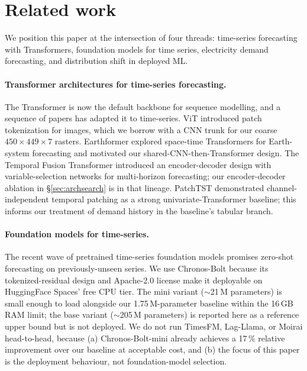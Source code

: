 
\section{Related work}
\label{sec:relwork}

We position this paper at the intersection of four threads: time-series forecasting with Transformers, foundation models for time series, electricity demand forecasting, and distribution shift in deployed ML.

\paragraph{Transformer architectures for time-series forecasting.} The Transformer \citep{vaswani2017attention} is now the default backbone for sequence modelling, and a sequence of papers has adapted it to time-series. ViT \citep{dosovitskiy2021vit} introduced patch tokenization for images, which we borrow with a CNN trunk for our coarse $450{\times}449{\times}7$ rasters. Earthformer \citep{gao2022earthformer} explored space-time Transformers for Earth-system forecasting and motivated our shared-CNN-then-Transformer design. The Temporal Fusion Transformer \citep{lim2021tft} introduced an encoder-decoder design with variable-selection networks for multi-horizon forecasting; our encoder-decoder ablation in \S\ref{sec:archsearch} is in that lineage. PatchTST \citep{nie2023patchtst} demonstrated channel-independent temporal patching as a strong univariate-Transformer baseline; this informs our treatment of demand history in the baseline's tabular branch.

\paragraph{Foundation models for time-series.} The recent wave of pretrained time-series foundation models \citep{ansari2024chronos,das2024timesfm,rasul2024lagllama,woo2024moirai} promises zero-shot forecasting on previously-unseen series. We use Chronos-Bolt \citep{ansari2024chronos} because its tokenized-residual design and Apache-2.0 license make it deployable on HuggingFace Spaces' free CPU tier. The mini variant ($\sim$21\,M parameters) is small enough to load alongside our 1.75\,M-parameter baseline within the 16\,GB RAM limit; the base variant ($\sim$205\,M parameters) is reported here as a reference upper bound but is not deployed. We do not run TimesFM, Lag-Llama, or Moirai head-to-head, because (a) Chronos-Bolt-mini already achieves a 17\,\% relative improvement over our baseline at acceptable cost, and (b) the focus of this paper is the deployment behaviour, not foundation-model selection.

